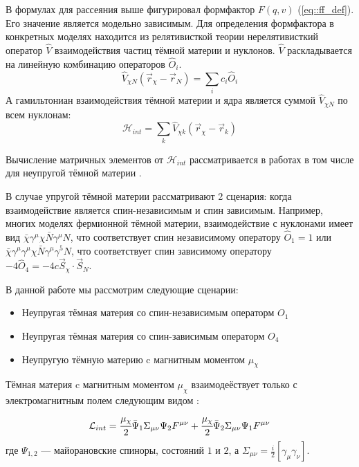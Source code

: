 В формулах для рассеяния выше фигурировал формфактор $F(q,v)$ (\ref{eq::ff_def}). Его значение является модельно зависимым. Для определения формфактора в конкретных моделях находится из релятивисткой теории нерелятивисткий оператор $\hat{V}$ взаимодействия частиц тёмной материи и нуклонов.
$\hat{V}$ раскладывается на линейную комбинацию операторов $\hat{O}_i$.
\begin{equation}
	\hat{V}_{\chi N}(\vec{r}_{\chi} - \vec{r}_{N}) = \sum_i{c_i \hat{O}_i} 
\end{equation}
А гамильтониан взаимодействия тёмной материи и ядра является суммой $\hat{V}_{\chi N}$ по всем нуклонам:
\begin{equation}
	\mathcal{H}_{int} = \sum_{k}{\hat{V}_{\chi k}(\vec{r}_{\chi} - \vec{r}_{k})} 
\end{equation}

Вычисление матричных элементов от $\mathcal{H}_{int}$ рассматривается в работах \cite{EffectiveDM_2013,MathematicaFF_2014,FFInSun_2015,DM_interaction_review_2022} в том числе для неупругой тёмной материи \cite{InelasticFF2_2014,InelasticFormFactors_2016}. 

В случае упругой тёмной материи рассматривают 2 сценария: когда взаимодействие является спин-независимым и спин зависимым. 
Например, многих моделях фермионной тёмной материи, взаимодействие с нуклонами имеет вид $\bar{\chi}\gamma^{\mu}\chi \bar{N}\gamma^{\mu}N$, что соответствует спин независимому оператору $\hat{O}_1 = 1$ или $\bar{\chi}\gamma^{\mu}\gamma^{\mu}\chi \bar{N}\gamma^{\mu}\gamma^{5}N$, что соответствует спин зависимому оператору $-4\hat{O}_4 = -4c \vec{S}_{\chi}\cdot\vec{S}_{N}$.

В данной работе мы рассмотрим следующие сценарии:

\begin{itemize}
	\item Неупругая тёмная материя со спин-независимым операторм $O_1$
	\item Неупругая тёмная материя со спин-зависимым операторм $O_4$
	\item Неупругую тёмную материю c магнитным моментом $\mu_{\chi}$
\end{itemize}
Тёмная материя c магнитным моментом $\mu_{\chi}$ взаимодеёствует только с электромагнитным полем следующим видом \cite{Magnetic_2024}:
	\begin{equation*}
	\mathcal{L}_{int} = \cfrac{\mu_{\chi}}{2} \bar{\Psi}_1 \Sigma_{\mu\nu} \Psi_2 F^{\mu\nu} + \cfrac{\mu_{\chi}}{2} \bar{\Psi}_2 \Sigma_{\mu\nu} \Psi_1 F^{\mu\nu} 
\end{equation*}
где ${\Psi}_{1,2}$ --- майорановские спиноры, состояний $1$ и $2$, а $\Sigma_{\mu\nu} = \frac{i}{2}[\gamma_{\mu}\gamma_{\nu}]$.

